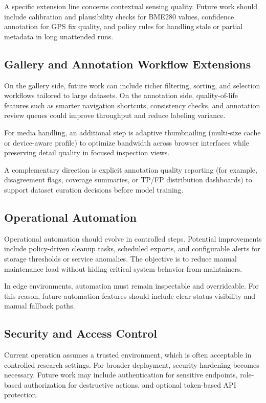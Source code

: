 A specific extension line concerns contextual sensing quality. Future work should include calibration and plausibility checks for BME280 values, confidence annotation for GPS fix quality, and policy rules for handling stale or partial metadata in long unattended runs.

\subsection{Gallery and Annotation Workflow Extensions}
On the gallery side, future work can include richer filtering, sorting, and selection workflows tailored to large datasets. On the annotation side, quality-of-life features such as smarter navigation shortcuts, consistency checks, and annotation review queues could improve throughput and reduce labeling variance.

For media handling, an additional step is adaptive thumbnailing (multi-size cache or device-aware profile) to optimize bandwidth across browser interfaces while preserving detail quality in focused inspection views.

A complementary direction is explicit annotation quality reporting (for example, disagreement flags, coverage summaries, or TP/FP distribution dashboards) to support dataset curation decisions before model training.

\subsection{Operational Automation}
Operational automation should evolve in controlled steps. Potential improvements include policy-driven cleanup tasks, scheduled exports, and configurable alerts for storage thresholds or service anomalies. The objective is to reduce manual maintenance load without hiding critical system behavior from maintainers.

In edge environments, automation must remain inspectable and overrideable. For this reason, future automation features should include clear status visibility and manual fallback paths.

\subsection{Security and Access Control}
Current operation assumes a trusted environment, which is often acceptable in controlled research settings. For broader deployment, security hardening becomes necessary. Future work may include authentication for sensitive endpoints, role-based authorization for destructive actions, and optional token-based API protection.

